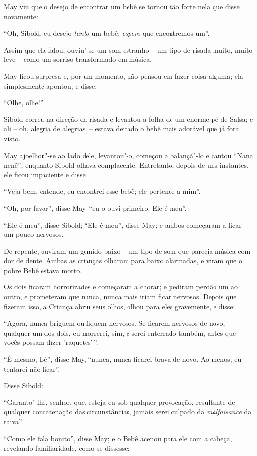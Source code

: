May viu que o desejo de encontrar um bebê se tornou tão forte nela que
disse novamente:

``Oh, Sibold, eu desejo \emph{tanto} um bebê; \emph{espero} que
encontremos um''.

Assim que ela falou, ouviu"-se um som estranho -- um tipo de risada
muito, muito leve -- como um sorriso transformado em música.

May ficou surpresa e, por um momento, não pensou em fazer coisa alguma;
ela simplesmente apontou, e disse:

``Olhe, olhe!''

Sibold correu na direção da risada e levantou a folha de um enorme pé de
Salsa; e ali -- oh, alegria de alegrias! -- estava deitado o bebê mais
adorável que já fora visto.

May ajoelhou"-se ao lado dele, levantou"-o, começou a balançá"-lo e cantou
``Nana nenê'', enquanto Sibold olhava complacente. Entretanto, depois de
uns instantes, ele ficou impaciente e disse:

``Veja bem, entende, eu encontrei esse bebê; ele pertence a mim''.

``Oh, por favor'', disse May, ``eu o ouvi primeiro. Ele é meu''.

``Ele é meu'', disse Sibold; ``Ele é meu'', disse May; e ambos começaram
a ficar um pouco nervosos.

De repente, ouviram um gemido baixo -- um tipo de som que parecia música
com dor de dente. Ambas as crianças olharam para baixo alarmadas, e
viram que o pobre Bebê estava morto.

Os dois ficaram horrorizados e começaram a chorar; e pediram perdão um
ao outro, e prometeram que nunca, nunca mais iriam ficar nervosos.
Depois que fizeram isso, a Criança abriu seus olhos, olhou para eles
gravemente, e disse:

``Agora, nunca briguem ou fiquem nervosos. Se ficarem nervosos de novo,
qualquer um dos dois, eu morrerei, sim, e serei enterrado também, antes
que vocês possam dizer `raquetes'\,''.

``É mesmo, Bê'', disse May, ``nunca, nunca ficarei brava de novo. Ao
menos, eu tentarei não ficar''.

Disse Sibold:

``Garanto"-lhe, senhor, que, esteja eu sob qualquer provocação,
resultante de qualquer concatenação das circunstâncias, jamais serei
culpado da \emph{malfaisance} da raiva''.

``Como ele fala bonito'', disse May; e o Bebê acenou para ele com a
cabeça, revelando familiaridade, como se dissesse:

